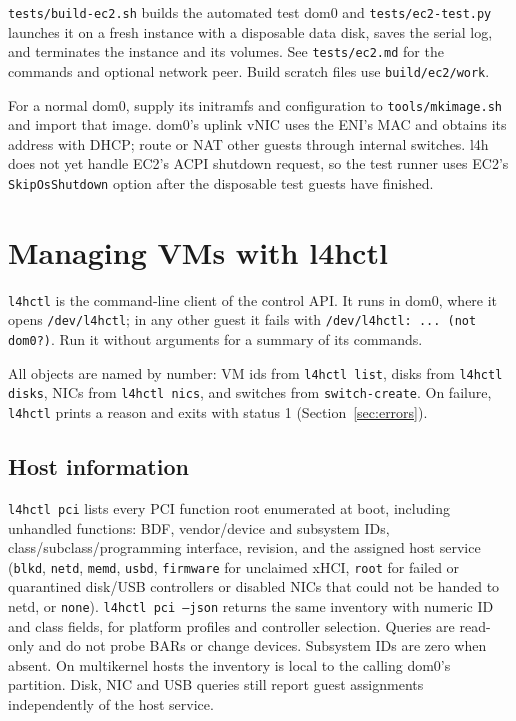 \documentclass[11pt,a4paper]{report}
\newcommand{\cmd}[1]{\texttt{#1}}
\newcommand{\file}[1]{\texttt{#1}}
\begin{document}
\file{tests/build-ec2.sh} builds the automated test dom0 and
\file{tests/ec2-test.py} launches it on a fresh instance with a disposable
data disk, saves the serial log, and terminates the instance and its
volumes. See \file{tests/ec2.md} for the commands and optional network
peer. Build scratch files use \file{build/ec2/work}.

For a normal dom0, supply its initramfs and configuration to
\file{tools/mkimage.sh} and import that image. dom0's uplink vNIC uses
the ENI's MAC and obtains its address with DHCP; route or NAT other
guests through internal switches. l4h does not yet handle EC2's ACPI
shutdown request, so the test runner uses EC2's \texttt{SkipOsShutdown}
option after the disposable test guests have finished.

\chapter{Managing VMs with l4hctl}
\label{ch:l4hctl}

\cmd{l4hctl} is the command-line client of the control API. It runs in
dom0, where it opens \file{/dev/l4hctl}; in any other guest it fails with
\texttt{/dev/l4hctl: ... (not dom0?)}. Run it without arguments for a
summary of its commands.

All objects are named by number: VM ids from \cmd{l4hctl list}, disks from
\cmd{l4hctl disks}, NICs from \cmd{l4hctl nics}, and switches from
\cmd{switch-create}. On failure, \cmd{l4hctl} prints a reason and exits
with status 1 (Section~\ref{sec:errors}).

\section{Host information}

\cmd{l4hctl pci} lists every PCI function root enumerated at boot,
including unhandled functions: BDF, vendor/device and subsystem IDs,
class/subclass/programming interface, revision, and the assigned host
service (\texttt{blkd}, \texttt{netd}, \texttt{memd}, \texttt{usbd},
\texttt{firmware} for unclaimed xHCI, \texttt{root} for failed or
quarantined disk/USB controllers or disabled NICs that could not be
handed to netd, or
\texttt{none}).
\cmd{l4hctl pci --json} returns the same inventory with numeric ID and
class fields, for platform profiles and controller selection. Queries
are read-only and do not probe BARs or change devices. Subsystem IDs
are zero when absent. On multikernel hosts the inventory is local to
the calling dom0's partition. Disk, NIC and USB queries still report
guest assignments independently of the host service.
\end{document}
